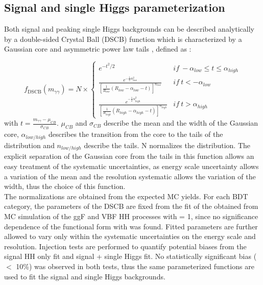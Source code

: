 \subsection{Signal and single Higgs parameterization}
\label{HHyybb:Modelling:Sig}

Both signal and peaking single Higgs backgrounds can be described analytically by a double-sided Crystal Ball (DSCB) function which is characterized by a Gaussian core and asymmetric power law tails \cite{Higgs_2018}, defined as :

\begin{equation}
    f_{\mathrm{DSCB}}\left(m_{\gamma \gamma}\right)=N \times\left\{\begin{array}{ll}
e^{-t^{2} / 2} &  if \ -\alpha_{low } \leq t \leq \alpha_{high } \\

\frac{e^{-\frac{1}{2} \alpha_{low }^{2}}} {  \left[  \frac{1}{ R_{low} } \left(R_{low }-\alpha_{low }-t\right) \right]^{n_{low }}} & if \ t<-\alpha_{low } \\

\frac{e^{-\frac{1}{2} \alpha_{high }^{2}}} {  \left[  \frac{1}{ R_{high} } \left(R_{high }-\alpha_{high }-t\right) \right]^{n_{high }}} &  if \ t>\alpha_{high }
\end{array}\right.
\end{equation}
with $t = \frac{m_{\gamma\gamma} - \mu_{CB}}{\sigma_{CB}}$. $\mu_{CB}$ and $\sigma_{CB}$ describe the mean and the width of the Gaussian core, $\alpha_{low/high}$ describes the transition from the core to the tails of the distribution and $n_{low/high}$ describe the tails. N normalizes the distribution. The explicit separation of the Gaussian core from the tails in this function allows an easy treatment of the systematic uncertainties, as energy scale uncertainty allows a variation of the mean and the resolution systematic allows the variation of the width, thus the choice of this function.\\
The normalizations are obtained from the expected MC yields. For each BDT category, the parameters of the DSCB are fixed from the fit of the \myy obtained from MC simulation of the ggF and VBF HH processes with \kl = 1, since no significance dependence of the functional form with \kl was found. Fitted parameters are further allowed to vary only within the systematic uncertainties on the energy scale and resolution. Injection tests are performed to quantify potential biases from the signal HH only fit and signal + single Higgs fit. No statistically significant bias ($<$ 10\%) was observed in both tests, thus the same parameterized functions are used to fit the signal and single Higgs backgrounds.    


